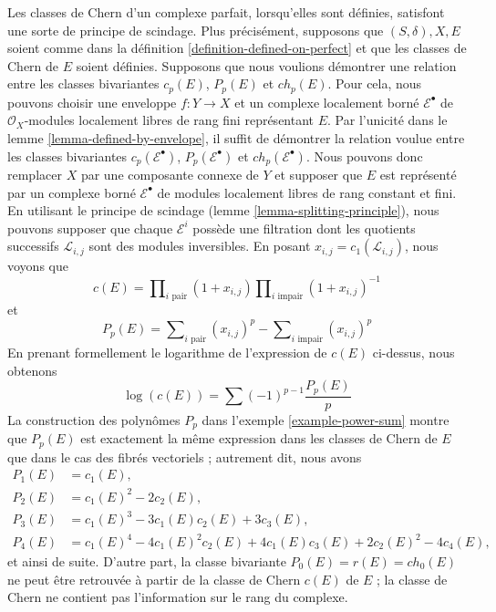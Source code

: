 \begin{remark}
\label{remark-splitting-principle-perfect}
Les classes de Chern d'un complexe parfait, lorsqu'elles sont définies, satisfont une sorte de
principe de scindage. Plus précisément, supposons que $(S, \delta), X, E$ soient comme dans la
définition \ref{definition-defined-on-perfect}
et que les classes de Chern de $E$ soient définies.
Supposons que nous voulions démontrer une relation entre les classes bivariantes
$c_p(E)$, $P_p(E)$ et $ch_p(E)$. Pour cela, nous pouvons choisir une
enveloppe $f : Y \to X$ et un complexe localement borné
$\mathcal{E}^\bullet$ de $\mathcal{O}_X$-modules localement libres de rang fini
représentant $E$. Par l'unicité dans le lemme \ref{lemma-defined-by-envelope},
il suffit de démontrer la relation voulue entre les classes bivariantes
$c_p(\mathcal{E}^\bullet)$, $P_p(\mathcal{E}^\bullet)$ et
$ch_p(\mathcal{E}^\bullet)$. Nous pouvons donc remplacer $X$ par une composante
connexe de $Y$ et supposer que $E$ est représenté par un complexe borné
$\mathcal{E}^\bullet$ de modules localement libres de rang constant et fini.
En utilisant le principe de scindage
(lemme \ref{lemma-splitting-principle}), nous pouvons supposer que chaque
$\mathcal{E}^i$ possède une filtration dont les quotients
successifs $\mathcal{L}_{i, j}$ sont des modules inversibles.
En posant $x_{i, j} = c_1(\mathcal{L}_{i, j})$, nous voyons que
$$
c(E) =
\prod\nolimits_{i\text{ pair}} (1 + x_{i, j})
\prod\nolimits_{i\text{ impair}} (1 + x_{i, j})^{-1}
$$
et
$$
P_p(E) =  \sum\nolimits_{i\text{ pair}} (x_{i, j})^p -
\sum\nolimits_{i\text{ impair}} (x_{i, j})^p
$$
En prenant formellement le logarithme de l'expression de $c(E)$ ci-dessus,
nous obtenons
$$
\log(c(E)) = \sum (-1)^{p - 1}\frac{P_p(E)}{p}
$$
La construction des polynômes $P_p$ dans
l'exemple \ref{example-power-sum} montre que $P_p(E)$
est exactement la même expression dans les classes de Chern de $E$
que dans le cas des fibrés vectoriels ; autrement dit, nous avons
\begin{align*}
P_1(E) & = c_1(E), \\
P_2(E) & = c_1(E)^2 - 2c_2(E), \\
P_3(E) & = c_1(E)^3 - 3c_1(E)c_2(E) + 3c_3(E), \\
P_4(E) & = c_1(E)^4 - 4c_1(E)^2c_2(E) + 4c_1(E)c_3(E) + 2c_2(E)^2 - 4c_4(E),
\end{align*}
et ainsi de suite. D'autre part, la classe bivariante $P_0(E) = r(E) = ch_0(E)$
ne peut être retrouvée à partir de la classe de Chern $c(E)$ de $E$ ; la classe de Chern
ne contient pas l'information sur le rang du complexe.
\end{remark}

